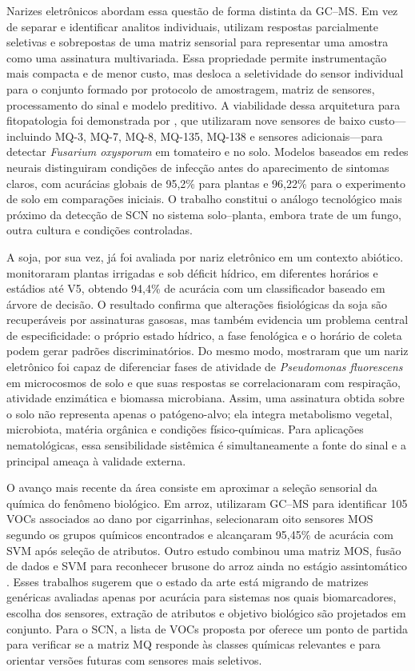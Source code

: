 \documentclass[12pt,a4paper]{article}
\begin{document}
Narizes eletrônicos abordam essa questão de forma distinta da GC--MS. Em vez de separar e identificar analitos individuais, utilizam respostas parcialmente seletivas e sobrepostas de uma matriz sensorial para representar uma amostra como uma assinatura multivariada. Essa propriedade permite instrumentação mais compacta e de menor custo, mas desloca a seletividade do sensor individual para o conjunto formado por protocolo de amostragem, matriz de sensores, processamento do sinal e modelo preditivo. A viabilidade dessa arquitetura para fitopatologia foi demonstrada por \citet{feng2022}, que utilizaram nove sensores de baixo custo---incluindo MQ-3, MQ-7, MQ-8, MQ-135, MQ-138 e sensores adicionais---para detectar \textit{Fusarium oxysporum} em tomateiro e no solo. Modelos baseados em redes neurais distinguiram condições de infecção antes do aparecimento de sintomas claros, com acurácias globais de 95,2\% para plantas e 96,22\% para o experimento de solo em comparações iniciais. O trabalho constitui o análogo tecnológico mais próximo da detecção de SCN no sistema solo--planta, embora trate de um fungo, outra cultura e condições controladas.

A soja, por sua vez, já foi avaliada por nariz eletrônico em um contexto abiótico. \citet{herrmann2024} monitoraram plantas irrigadas e sob déficit hídrico, em diferentes horários e estádios até V5, obtendo 94,4\% de acurácia com um classificador baseado em árvore de decisão. O resultado confirma que alterações fisiológicas da soja são recuperáveis por assinaturas gasosas, mas também evidencia um problema central de especificidade: o próprio estado hídrico, a fase fenológica e o horário de coleta podem gerar padrões discriminatórios. Do mesmo modo, \citet{decesare2011} mostraram que um nariz eletrônico foi capaz de diferenciar fases de atividade de \textit{Pseudomonas fluorescens} em microcosmos de solo e que suas respostas se correlacionaram com respiração, atividade enzimática e biomassa microbiana. Assim, uma assinatura obtida sobre o solo não representa apenas o patógeno-alvo; ela integra metabolismo vegetal, microbiota, matéria orgânica e condições físico-químicas. Para aplicações nematológicas, essa sensibilidade sistêmica é simultaneamente a fonte do sinal e a principal ameaça à validade externa.

O avanço mais recente da área consiste em aproximar a seleção sensorial da química do fenômeno biológico. Em arroz, \citet{li2025planthopper} utilizaram GC--MS para identificar 105 VOCs associados ao dano por cigarrinhas, selecionaram oito sensores MOS segundo os grupos químicos encontrados e alcançaram 95,45\% de acurácia com SVM após seleção de atributos. Outro estudo combinou uma matriz MOS, fusão de dados e SVM para reconhecer brusone do arroz ainda no estágio assintomático \cite{wang2025riceblast}. Esses trabalhos sugerem que o estado da arte está migrando de matrizes genéricas avaliadas apenas por acurácia para sistemas nos quais biomarcadores, escolha dos sensores, extração de atributos e objetivo biológico são projetados em conjunto. Para o SCN, a lista de VOCs proposta por \citet{constantino2021} oferece um ponto de partida para verificar se a matriz MQ responde às classes químicas relevantes e para orientar versões futuras com sensores mais seletivos.
\end{document}
